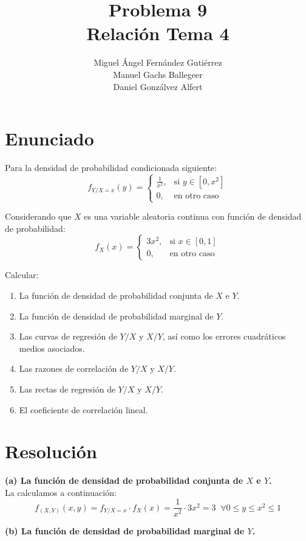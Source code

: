 \documentclass[11pt]{article}
\title{\textbf{Problema 9}\\\Large{Relación Tema 4}}
\author{Miguel Ángel Fernández Gutiérrez\\
		Manuel Gachs Ballegeer\\
		Daniel Gonzálvez Alfert}
\date{}
\begin{document}
\maketitle

\section*{Enunciado}

Para la densidad de probabilidad condicionada siguiente:
$$
f_{Y/X=x}(y)=\left\{
	\begin{array}{rl}
		\frac{1}{x^2},  & \mbox{si } y \in [0,x^2] \\
		0, & \mbox{en otro caso }
	\end{array}
\right.
$$

Considerando que $X$ es una variable aleatoria continua con función de densidad de probabilidad:
$$
f_X(x)=\left\{
	\begin{array}{rl}
		3x^2,  & \mbox{si } x \in [0,1] \\
		0, & \mbox{en otro caso }
	\end{array}
\right.
$$

Calcular:
\begin{enumerate}[label=(\alph*)]
	\item La función de densidad de probabilidad conjunta de $X$ e $Y$.
	\item La función de densidad de probabilidad marginal de $Y$.
	\item Las curvas de regresión de $Y/X$ y $X/Y$, así como los errores cuadráticos medios asociados.
	\item Las razones de correlación de $Y/X$ y $X/Y$.
	\item Las rectas de regresión de $Y/X$ y $X/Y$.
	\item El coeficiente de correlación lineal.
\end{enumerate}

\newpage
\section*{Resolución}

\textbf{(a) La función de densidad de probabilidad conjunta de $X$ e $Y$.}\\

La calculamos a continuación:
$$f_{(X,Y)}(x,y)=f_{Y/X=x}\cdot f_X(x)=\frac{1}{x^2}\cdot 3x^2=3\;\;\forall 0 \leq y \leq x^2 \leq 1$$

\vspace{0.5cm}
\textbf{(b) La función de densidad de probabilidad marginal de $Y$.}\\
\end{document}
